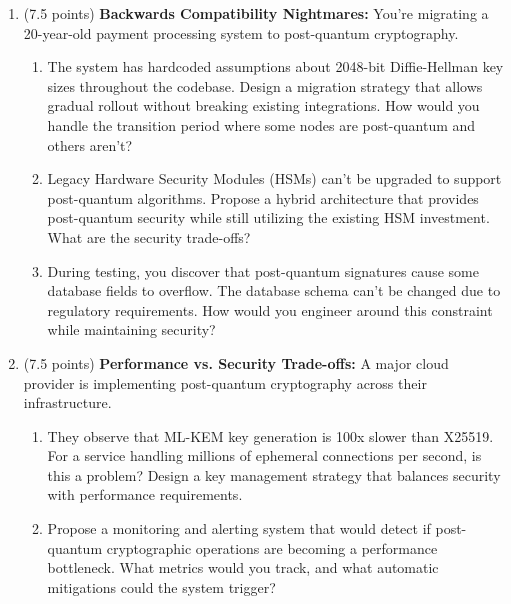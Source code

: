 \documentclass[10pt,a4paper,american]{article}
\begin{document}
\begin{enumerate}
	\item (7.5 points) \textbf{Backwards Compatibility Nightmares:}
	      You're migrating a 20-year-old payment processing system to post-quantum cryptography.
	      \begin{enumerate}
		      \item The system has hardcoded assumptions about 2048-bit Diffie-Hellman key sizes throughout the codebase. Design a migration strategy that allows gradual rollout without breaking existing integrations. How would you handle the transition period where some nodes are post-quantum and others aren't?
		      \item Legacy Hardware Security Modules (HSMs) can't be upgraded to support post-quantum algorithms. Propose a hybrid architecture that provides post-quantum security while still utilizing the existing HSM investment. What are the security trade-offs?
		      \item During testing, you discover that post-quantum signatures cause some database fields to overflow. The database schema can't be changed due to regulatory requirements. How would you engineer around this constraint while maintaining security?
	      \end{enumerate}
	\item (7.5 points) \textbf{Performance vs. Security Trade-offs:}
	      A major cloud provider is implementing post-quantum cryptography across their infrastructure.
	      \begin{enumerate}
		      \item They observe that ML-KEM key generation is 100x slower than X25519. For a service handling millions of ephemeral connections per second, is this a problem? Design a key management strategy that balances security with performance requirements.
		      \item Propose a monitoring and alerting system that would detect if post-quantum cryptographic operations are becoming a performance bottleneck. What metrics would you track, and what automatic mitigations could the system trigger?
	      \end{enumerate}
\end{enumerate}
\end{document}
